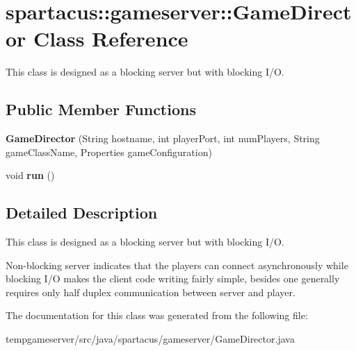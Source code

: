 \hypertarget{classspartacus_1_1gameserver_1_1GameDirector2}{
\section{\-s\-p\-a\-r\-t\-a\-c\-u\-s\-:\-:\-g\-a\-m\-e\-s\-e\-r\-v\-e\-r\-:\-:\-G\-a\-m\-e\-D\-i\-r\-e\-c\-t\-o\-r \-C\-l\-a\-s\-s \-R\-e\-f\-e\-r\-e\-n\-c\-e}
\label{classspartacus_1_1gameserver_1_1GameDirector2}
}


This class is designed as a blocking server but with blocking I/O.  


\subsection*{Public Member Functions}
\begin{DoxyCompactItemize}
\item 
\hypertarget{classspartacus_1_1gameserver_1_1GameDirector2_a61e7a6c6894528fed04b9f8130dc7262}{
{\bfseries \-G\-a\-m\-e\-D\-i\-r\-e\-c\-t\-o\-r} \-(\-S\-t\-r\-i\-n\-g \-h\-o\-s\-t\-n\-a\-m\-e, \-i\-n\-t \-p\-l\-a\-y\-e\-r\-P\-o\-r\-t, \-i\-n\-t \-n\-u\-m\-P\-l\-a\-y\-e\-r\-s, \-S\-t\-r\-i\-n\-g \-g\-a\-m\-e\-C\-l\-a\-s\-s\-N\-a\-m\-e, \-P\-r\-o\-p\-e\-r\-t\-i\-e\-s \-g\-a\-m\-e\-C\-o\-n\-f\-i\-g\-u\-r\-a\-t\-i\-o\-n\-)}
\label{classspartacus_1_1gameserver_1_1GameDirector2_a61e7a6c6894528fed04b9f8130dc7262}

\item 
\hypertarget{classspartacus_1_1gameserver_1_1GameDirector2_adfe22e84caaaec7c943d4d1ed12f31e1}{
\-v\-o\-i\-d {\bfseries \-r\-u\-n} \-(\-)}
\label{classspartacus_1_1gameserver_1_1GameDirector2_adfe22e84caaaec7c943d4d1ed12f31e1}

\end{DoxyCompactItemize}


\subsection{Detailed Description}
This class is designed as a blocking server but with blocking I/O. 

Non-\/blocking server indicates that the players can connect asynchronously while blocking I/O makes the client code writing fairly simple, besides one generally requires only half duplex communication between server and player. 

The documentation for this class was generated from the following file:\begin{DoxyCompactItemize}
\item 
\-t\-e\-m\-p\-g\-a\-m\-e\-s\-e\-r\-v\-e\-r\-/\-s\-r\-c\-/\-j\-a\-v\-a\-/\-s\-p\-a\-r\-t\-a\-c\-u\-s\-/\-g\-a\-m\-e\-s\-e\-r\-v\-e\-r\-/\-G\-a\-m\-e\-D\-i\-r\-e\-c\-t\-o\-r\-.\-j\-a\-v\-a\end{DoxyCompactItemize}
